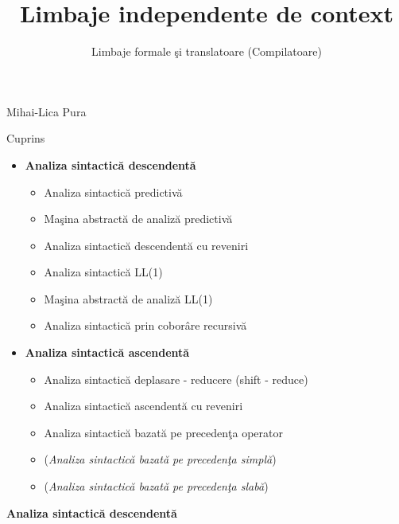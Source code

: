 \documentclass[pdf]{beamer}
\title{Limbaje independente de context}
\subtitle{Limbaje formale şi translatoare (Compilatoare)}
\begin{document}
\begin{frame}
	\titlepage
	
\begin{flushright}
Mihai-Lica Pura\\
\end{flushright}

\end{frame}



\begin{frame}{Cuprins}
\begin{itemize}
\item
\textbf{Analiza sintactică descendentă}
\begin{itemize}
\item
Analiza sintactică predictivă
\item
Maşina abstractă de analiză predictivă
\item
Analiza sintactică descendentă cu reveniri 
\item
Analiza sintactică LL(1)
\item
Maşina abstractă de analiză LL(1)
\item
Analiza sintactică prin coborâre recursivă
\end{itemize}
\item
\textbf{Analiza sintactică ascendentă}
\begin{itemize}
\item
Analiza sintactică deplasare - reducere (shift - reduce)
\item
Analiza sintactică ascendentă cu reveniri
\item
Analiza sintactică bazată pe precedenţa operator
\item
(\textit{Analiza sintactică bazată pe precedenţa simplă})
\item
(\textit{Analiza sintactică bazată pe precedenţa slabă})
\end{itemize}
\end{itemize}
\end{frame}



\begin{frame}
\begin{center}
\textbf{Analiza sintactică descendentă}
\end{center}
\end{frame}
\end{document}
